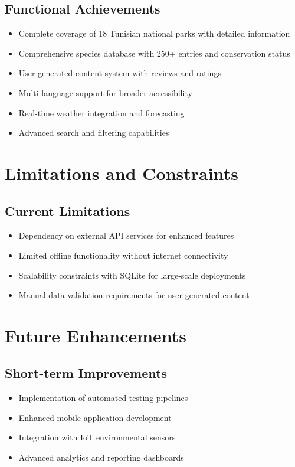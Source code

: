 \documentclass[12pt,a4paper]{report}
\begin{document}
\subsection{Functional Achievements}
\begin{itemize}
    \item Complete coverage of 18 Tunisian national parks with detailed information
    \item Comprehensive species database with 250+ entries and conservation status
    \item User-generated content system with reviews and ratings
    \item Multi-language support for broader accessibility
    \item Real-time weather integration and forecasting
    \item Advanced search and filtering capabilities
\end{itemize}

\section{Limitations and Constraints}

\subsection{Current Limitations}
\begin{itemize}
    \item Dependency on external API services for enhanced features
    \item Limited offline functionality without internet connectivity
    \item Scalability constraints with SQLite for large-scale deployments
    \item Manual data validation requirements for user-generated content
\end{itemize}

\section{Future Enhancements}

\subsection{Short-term Improvements}
\begin{itemize}
    \item Implementation of automated testing pipelines
    \item Enhanced mobile application development
    \item Integration with IoT environmental sensors
    \item Advanced analytics and reporting dashboards
\end{itemize}
\end{document}
